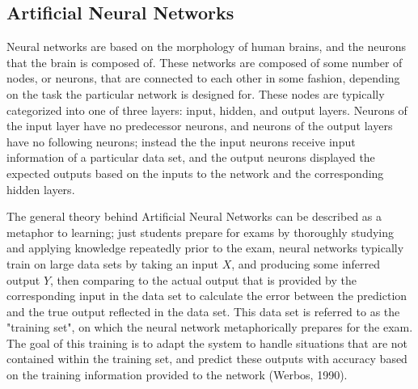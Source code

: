 \documentclass[11pt,titlepage]{article}
\begin{document}
\subsection{Artificial Neural Networks}
Neural networks are based on the morphology of human brains, and the neurons that the brain is composed of. These networks are composed of some number of nodes, or neurons, that are connected to each other in some fashion, depending on the task the particular network is designed for. These nodes are typically categorized into one of three layers: input, hidden, and output layers. Neurons of the input layer have no predecessor neurons, and neurons of the output layers have no following neurons; instead the the input neurons receive input information of a particular data set, and the output neurons displayed the expected outputs based on the inputs to the network and the corresponding hidden layers.\par

The general theory behind Artificial Neural Networks can be described as a metaphor to learning; just students prepare for exams by thoroughly studying and applying knowledge repeatedly prior to the exam, neural networks typically train on large data sets by taking an input $X$, and producing some inferred output $Y$, then comparing to the actual output that is provided by the corresponding input in the data set to calculate the error between the prediction and the true output reflected in the data set. This data set is referred to as the "training set", on which the neural network  metaphorically prepares for the exam. The goal of this training is to adapt the system to handle situations that are not contained within the training set, and predict these outputs with accuracy based on the training information provided to the network (Werbos, 1990).\par
\end{document}
